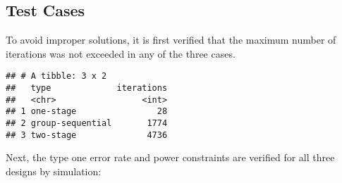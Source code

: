\documentclass[
]{book}
\newenvironment{Shaded}{\begin{snugshade}}{\end{snugshade}}
\newcommand{\DataTypeTok}[1]{\textcolor[rgb]{0.13,0.29,0.53}{#1}}
\newcommand{\KeywordTok}[1]{\textcolor[rgb]{0.13,0.29,0.53}{\textbf{#1}}}
\newcommand{\NormalTok}[1]{#1}
\newcommand{\OperatorTok}[1]{\textcolor[rgb]{0.81,0.36,0.00}{\textbf{#1}}}
\newcommand{\StringTok}[1]{\textcolor[rgb]{0.31,0.60,0.02}{#1}}
\begin{document}
\hypertarget{test-cases-14}{%
\subsection{Test Cases}\label{test-cases-14}}

To avoid improper solutions, it is first verified that the maximum
number of iterations was not exceeded in any of the three cases.

\begin{Shaded}
\end{Shaded}

\begin{verbatim}
## # A tibble: 3 x 2
##   type             iterations
##   <chr>                 <int>
## 1 one-stage                28
## 2 group-sequential       1774
## 3 two-stage              4736
\end{verbatim}

Next, the type one error rate and power constraints are verified
for all three designs by simulation:
\end{document}
